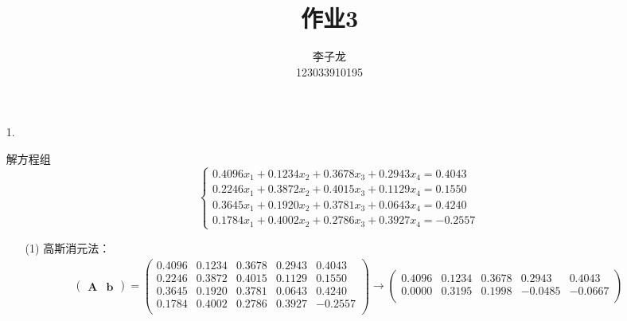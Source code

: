 \documentclass{sjtuarticle}
\title{作业3}
\author{李子龙\\123033910195}
\begin{document}
\maketitle

\begin{itemize}
    \item[1.] 
    \begin{solution}
        解方程组
        \begin{equation*}
            \begin{cases}
                0.4096x_1+0.1234x_2+0.3678x_3+0.2943x_4=0.4043 \\
                0.2246x_1+0.3872x_2+0.4015x_3+0.1129x_4=0.1550 \\
                0.3645x_1+0.1920x_2+0.3781x_3+0.0643x_4=0.4240 \\
                0.1784x_1+0.4002x_2+0.2786x_3+0.3927x_4=-0.2557
            \end{cases}
        \end{equation*}
        \begin{itemize}
            \item[(1)] 高斯消元法：
        \begin{align*}
            \begin{pmatrix}
                \bm{A} & \bm{b}
            \end{pmatrix}=\begin{pmatrix}
                0.4096 &       0.1234 &       0.3678 &       0.2943 &        0.4043\\
                0.2246 &       0.3872 &       0.4015 &       0.1129 &        0.1550\\
                0.3645 &       0.1920 &       0.3781 &       0.0643 &        0.4240\\
                0.1784 &       0.4002 &       0.2786 &       0.3927 &       -0.2557\\
            \end{pmatrix}\rightarrow
            \begin{pmatrix}
                0.4096 &       0.1234 &       0.3678 &       0.2943 &        0.4043\\
                0.0000 &       0.3195 &       0.1998 &      -0.0485 &       -0.0667\\

\end{pmatrix}
\end{align*}
\end{itemize}
\end{solution}
\end{itemize}
\end{document}
